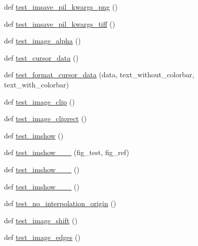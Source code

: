 \begin{DoxyCompactItemize}
\item 
def \hyperlink{namespacematplotlib_1_1tests_1_1test__image_aa773925592e3d0cced7a4a0889b2b109}{test\+\_\+imsave\+\_\+pil\+\_\+kwargs\+\_\+png} ()
\item 
def \hyperlink{namespacematplotlib_1_1tests_1_1test__image_a2eb64604895c9885d745b82e1d03ec71}{test\+\_\+imsave\+\_\+pil\+\_\+kwargs\+\_\+tiff} ()
\item 
def \hyperlink{namespacematplotlib_1_1tests_1_1test__image_a6203b6b2a17fdc88adbadec7ae61a67a}{test\+\_\+image\+\_\+alpha} ()
\item 
def \hyperlink{namespacematplotlib_1_1tests_1_1test__image_a9cae124dad241ccc727d85a13afcb0a5}{test\+\_\+cursor\+\_\+data} ()
\item 
def \hyperlink{namespacematplotlib_1_1tests_1_1test__image_afe14d0f606aea5576198cff66b07285f}{test\+\_\+format\+\_\+cursor\+\_\+data} (data, text\+\_\+without\+\_\+colorbar, text\+\_\+with\+\_\+colorbar)
\item 
def \hyperlink{namespacematplotlib_1_1tests_1_1test__image_a41b8298cad55135fdc2e72248226f403}{test\+\_\+image\+\_\+clip} ()
\item 
def \hyperlink{namespacematplotlib_1_1tests_1_1test__image_a6bfccf8c85240738fa752e7eb13a492a}{test\+\_\+image\+\_\+cliprect} ()
\item 
def \hyperlink{namespacematplotlib_1_1tests_1_1test__image_a14f79dd2c9d0057c5d24a6ac2233ed4b}{test\+\_\+imshow} ()
\item 
def \hyperlink{namespacematplotlib_1_1tests_1_1test__image_a0ec48d5981a0d8f4434af5074038cb71}{test\+\_\+imshow\+\_\+\_\+\_} (fig\+\_\+test, fig\+\_\+ref)
\item 
def \hyperlink{namespacematplotlib_1_1tests_1_1test__image_a9298fb1aef631d99751e04566a2b8138}{test\+\_\+imshow\+\_\+\_\+\_} ()
\item 
def \hyperlink{namespacematplotlib_1_1tests_1_1test__image_a433c74f9d57844999b7e2afebf00781e}{test\+\_\+imshow\+\_\+\_\+\_} ()
\item 
def \hyperlink{namespacematplotlib_1_1tests_1_1test__image_a826d34e587452966388565759ddf1e49}{test\+\_\+no\+\_\+interpolation\+\_\+origin} ()
\item 
def \hyperlink{namespacematplotlib_1_1tests_1_1test__image_a8636350f6731fc75c6b3b9af237f5746}{test\+\_\+image\+\_\+shift} ()
\item 
def \hyperlink{namespacematplotlib_1_1tests_1_1test__image_a1541a8567d1755de62ed81417e70a85e}{test\+\_\+image\+\_\+edges} ()

\end{DoxyCompactItemize}
